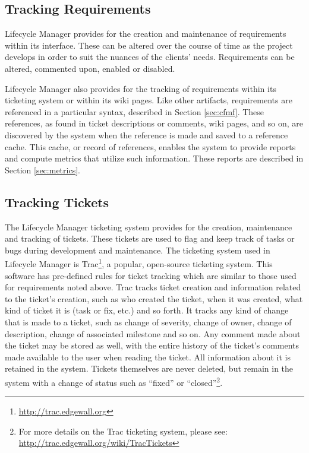 \documentclass[letterpaper,10pt]{article}
\begin{document}
		\subsection{Tracking Requirements}

            Lifecycle Manager provides for the creation and maintenance 
            of requirements within its interface.  These can be altered 
            over the course of time as the project develops in order to 
            suit the nuances of the clients' needs.  Requirements 
            can be altered, commented upon, enabled or disabled.

            Lifecycle Manager also provides for the tracking of
            requirements within its ticketing system or within its
            wiki pages.  Like other artifacts, requirements are
            referenced in a particular syntax, described in Section
            \ref{sec:cfmf}. These references, as found in ticket
            descriptions or comments, wiki pages, and so on, are
            discovered by the system when the reference is made and
            saved to a reference cache. This cache, or record of
            references, enables the system to provide reports and
            compute metrics that utilize such information. These
            reports are described in Section \ref{sec:metrics}.


		\subsection{Tracking Tickets}
	
                The Lifecycle Manager ticketing system provides for
                the creation, maintenance and tracking of tickets.
                These tickets are used to flag and keep track of tasks
                or bugs during development and maintenance.  The
                ticketing system used in Lifecycle Manager is
                Trac\footnote{\url{http://trac.edgewall.org}}, a
                popular, open-source ticketing system.  This software
                has pre-defined rules for ticket tracking which are
                similar to those used for requirements noted above.
                Trac tracks ticket creation and information related to
                the ticket's creation, such as who created the ticket,
                when it was created, what kind of ticket it is (task
                or fix, etc.) and so forth.  It tracks any kind of
                change that is made to a ticket, such as change of
                severity, change of owner, change of description,
                change of associated milestone and so on.  Any comment
                made about the ticket may be stored as well, with the
                entire history of the ticket's comments made available
                to the user when reading the ticket.  All information
                about it is retained in the system.  Tickets
                themselves are never deleted, but remain in the system
                with a change of status such as ``fixed'' or
                ``closed''\footnote{For more details on the Trac ticketing system, please see:
            \url{http://trac.edgewall.org/wiki/TracTickets}}.
	
\end{document}
